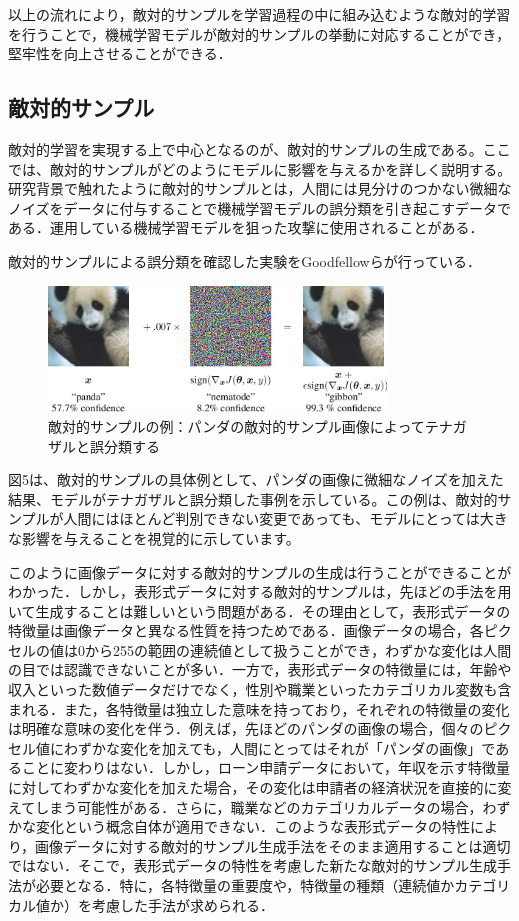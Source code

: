 以上の流れにより，敵対的サンプルを学習過程の中に組み込むような敵対的学習を行うことで，機械学習モデルが敵対的サンプルの挙動に対応することができ，堅牢性を向上させることができる．

\subsection{敵対的サンプル}
敵対的学習を実現する上で中心となるのが、敵対的サンプルの生成である。ここでは、敵対的サンプルがどのようにモデルに影響を与えるかを詳しく説明する。
研究背景で触れたように敵対的サンプルとは，人間には見分けのつかない微細なノイズをデータに付与することで機械学習モデルの誤分類を引き起こすデータである．\cite{MBSD-AdversarialExample}運用している機械学習モデルを狙った攻撃に使用されることがある．

敵対的サンプルによる誤分類を確認した実験をGoodfellowらが行っている\cite{goodfellow2015explaining}．
\begin{figure}[H]
    \centering
    \includegraphics[width=0.8\textwidth]{images/goodfellow_panda.png}
    \caption{敵対的サンプルの例：パンダの敵対的サンプル画像によってテナガザルと誤分類する\cite{goodfellow2015explaining}}
    \label{fig:adversarial_example}
\end{figure}

図5は、敵対的サンプルの具体例として、パンダの画像に微細なノイズを加えた結果、モデルがテナガザルと誤分類した事例を示している。この例は、敵対的サンプルが人間にはほとんど判別できない変更であっても、モデルにとっては大きな影響を与えることを視覚的に示しています。

このように画像データに対する敵対的サンプルの生成は行うことができることがわかった．しかし，表形式データに対する敵対的サンプルは，先ほどの手法を用いて生成することは難しいという問題がある．その理由として，表形式データの特徴量は画像データと異なる性質を持つためである．画像データの場合，各ピクセルの値は0から255の範囲の連続値として扱うことができ，わずかな変化は人間の目では認識できないことが多い．一方で，表形式データの特徴量には，年齢や収入といった数値データだけでなく，性別や職業といったカテゴリカル変数も含まれる．また，各特徴量は独立した意味を持っており，それぞれの特徴量の変化は明確な意味の変化を伴う．例えば，先ほどのパンダの画像の場合，個々のピクセル値にわずかな変化を加えても，人間にとってはそれが「パンダの画像」であることに変わりはない．しかし，ローン申請データにおいて，年収を示す特徴量に対してわずかな変化を加えた場合，その変化は申請者の経済状況を直接的に変えてしまう可能性がある．さらに，職業などのカテゴリカルデータの場合，わずかな変化という概念自体が適用できない．このような表形式データの特性により，画像データに対する敵対的サンプル生成手法をそのまま適用することは適切ではない．そこで，表形式データの特性を考慮した新たな敵対的サンプル生成手法が必要となる．特に，各特徴量の重要度や，特徴量の種類（連続値かカテゴリカル値か）を考慮した手法が求められる．


